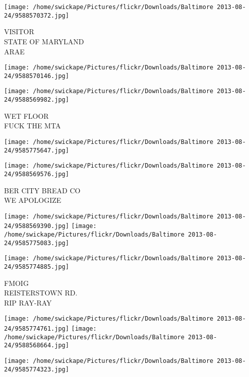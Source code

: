 \documentclass[10pt,letterpaper]{article}
\begin{document}
\vspace{0.25in}
\texttt{[image: /home/swickape/Pictures/flickr/Downloads/Baltimore 2013-08-24/9588570372.jpg]}

VISITOR\\
STATE OF MARYLAND\\
ARAE\\
\pagebreak

\texttt{[image: /home/swickape/Pictures/flickr/Downloads/Baltimore 2013-08-24/9588570146.jpg]}

\vspace{0.25in}
\texttt{[image: /home/swickape/Pictures/flickr/Downloads/Baltimore 2013-08-24/9588569982.jpg]}

WET FLOOR\\
FUCK THE MTA\\
\pagebreak

\texttt{[image: /home/swickape/Pictures/flickr/Downloads/Baltimore 2013-08-24/9585775647.jpg]}

\vspace{0.25in}
\texttt{[image: /home/swickape/Pictures/flickr/Downloads/Baltimore 2013-08-24/9588569576.jpg]}

BER CITY BREAD CO\\
WE APOLOGIZE\\
\pagebreak

\texttt{[image: /home/swickape/Pictures/flickr/Downloads/Baltimore 2013-08-24/9588569390.jpg]}
\texttt{[image: /home/swickape/Pictures/flickr/Downloads/Baltimore 2013-08-24/9585775083.jpg]}

\vspace{0.25in}
\texttt{[image: /home/swickape/Pictures/flickr/Downloads/Baltimore 2013-08-24/9585774885.jpg]}

FMOIG\\
REISTERSTOWN RD.\\
RIP RAY{-}RAY\\
\pagebreak

\texttt{[image: /home/swickape/Pictures/flickr/Downloads/Baltimore 2013-08-24/9585774761.jpg]}
\texttt{[image: /home/swickape/Pictures/flickr/Downloads/Baltimore 2013-08-24/9588568664.jpg]}

\vspace{0.25in}
\texttt{[image: /home/swickape/Pictures/flickr/Downloads/Baltimore 2013-08-24/9585774323.jpg]}
\end{document}
